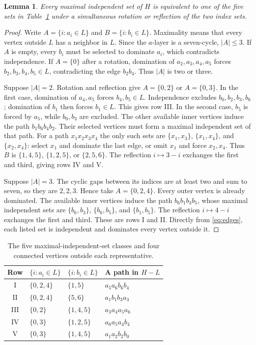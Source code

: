 \documentclass[11pt]{article}
\newtheorem{lemma}{Lemma}
\begin{document}
\begin{lemma}\label{lem:classes}
Every maximal independent set of $H$ is equivalent to one of the five
sets in Table~\ref{tab:classes} under a simultaneous rotation or reflection
of the two index sets.
\end{lemma}
\begin{proof}
Write $A=\{i:a_i\in L\}$ and $B=\{i:b_i\in L\}$. Maximality means that
every vertex outside $L$ has a neighbor in $L$. Since the $a$-layer is a
seven-cycle, $|A|\leq3$.
If $A$ is empty, every $b_i$ must be selected to dominate $a_i$, which
contradicts independence. If $A=\{0\}$ after a rotation, domination of
$a_2,a_3,a_4,a_5$ forces $b_2,b_3,b_4,b_5\in L$, contradicting the edge
$b_2b_4$. Thus $|A|$ is two or three.

Suppose $|A|=2$. Rotation and reflection give $A=\{0,2\}$ or
$A=\{0,3\}$. In the first case, domination of $a_4,a_5$ forces
$b_4,b_5\in L$. Independence excludes $b_0,b_2,b_3,b_6$; domination
of $b_1$ then forces $b_1\in L$. This gives row III.
In the second case, $b_5$ is forced by $a_5$, while $b_0,b_3$ are
excluded. The other available inner vertices induce the path
$b_1b_6b_4b_2$. Their selected vertices must form a maximal independent
set of that path. For a path $x_1x_2x_3x_4$ the only such sets are
$\{x_1,x_3\}$, $\{x_1,x_4\}$, and $\{x_2,x_4\}$: select $x_1$ and
dominate the last edge, or omit $x_1$ and force $x_2,x_4$.
Thus $B$ is $\{1,4,5\}$, $\{1,2,5\}$, or $\{2,5,6\}$.
The reflection $i\mapsto3-i$ exchanges the first and third, giving
rows IV and V.

Suppose $|A|=3$. The cyclic gaps between its indices are at least two
and sum to seven, so they are $2,2,3$. Hence take $A=\{0,2,4\}$.
Every outer vertex is already dominated. The available inner vertices
induce the path $b_6b_1b_3b_5$, whose maximal independent sets are
$\{b_6,b_3\}$, $\{b_6,b_5\}$, and $\{b_1,b_5\}$.
The reflection $i\mapsto4-i$ exchanges the first and third.
These are rows I and II. Directly from \eqref{eq:edges}, each listed
set is independent and dominates every vertex outside it.
\end{proof}

\begin{table}[ht]
\centering
\small
\begin{tabular}{@{}clll@{}}
\toprule
Row & $\{i:a_i\in L\}$ & $\{i:b_i\in L\}$ & A path in $H-L$\\
\midrule
I   & $\{0,2,4\}$ & $\{1,5\}$   & $a_5a_6b_6b_4$\\
II  & $\{0,2,4\}$ & $\{5,6\}$   & $a_1b_1b_3a_3$\\
III & $\{0,2\}$   & $\{1,4,5\}$ & $a_3a_4a_5a_6$\\
IV  & $\{0,3\}$   & $\{1,2,5\}$ & $a_6a_5a_4b_4$\\
V   & $\{0,3\}$   & $\{1,4,5\}$ & $a_1a_2b_2b_0$\\
\bottomrule
\end{tabular}
\caption{The five maximal-independent-set classes and four connected
vertices outside each representative.}\label{tab:classes}
\end{table}
\end{document}
